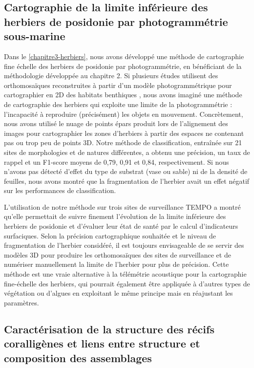 \subsection{Cartographie de la limite inférieure des herbiers de posidonie par photogrammétrie sous-marine}

Dans le \autoref{chapitre3-herbiers}, nous avons développé une méthode de cartographie fine échelle des herbiers de posidonie par photogrammétrie, en bénéficiant de la méthodologie développée au chapitre 2. Si plusieurs études utilisent des orthomosaïques reconstruites à partir d’un modèle photogrammétrique pour cartographier en 2D des habitats benthiques \citep{rende_advances_2015, bonin-font_towards_2016, mizuno_simple_2017}, nous avons imaginé une méthode de cartographie des herbiers qui exploite une limite de la photogrammétrie : l’incapacité à reproduire (précisément) les objets en mouvement. Concrètement, nous avons utilisé le nuage de points épars produit lors de l’alignement des images pour cartographier les zones d’herbiers à partir des espaces ne contenant pas ou trop peu de points 3D. Notre méthode de classification, entraînée sur 21 sites de morphologies et de natures différentes, a obtenu une précision, un taux de rappel et un F1-score moyens de 0,79, 0,91 et 0,84, respectivement. Si nous n’avons pas détecté d’effet du type de substrat (vase ou sable) ni de la densité de feuilles, nous avons montré que la fragmentation de l’herbier avait un effet négatif sur les performances de classification.

L’utilisation de notre méthode sur trois sites de surveillance TEMPO a montré qu’elle permettait de suivre finement l’évolution de la limite inférieure des herbiers de posidonie et d’évaluer leur état de santé par le calcul d’indicateurs surfaciques. Selon la précision cartographique souhaitée et le niveau de fragmentation de l’herbier considéré, il est toujours envisageable de se servir des modèles 3D pour produire les orthomosaïques des sites de surveillance et de numériser manuellement la limite de l’herbier pour plus de précision. Cette méthode est une vraie alternative à la télémétrie acoustique pour la cartographie fine-échelle des herbiers, qui pourrait également être appliquée à d’autres types de végétation ou d’algues en exploitant le même principe mais en réajustant les paramètres.

\subsection{Caractérisation de la structure des récifs coralligènes et liens entre structure et composition des assemblages}

